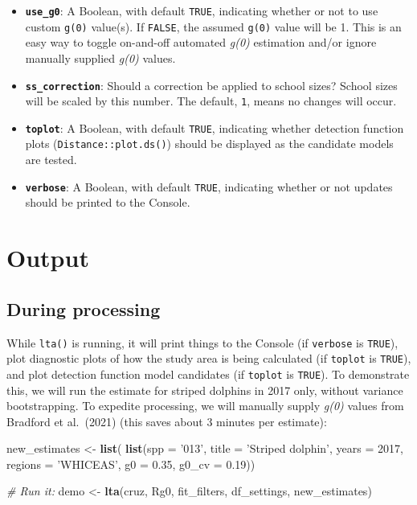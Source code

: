 \documentclass[
]{book}
\newenvironment{Shaded}{\begin{snugshade}}{\end{snugshade}}
\newcommand{\CommentTok}[1]{\textcolor[rgb]{0.56,0.35,0.01}{\textit{#1}}}
\newcommand{\DataTypeTok}[1]{\textcolor[rgb]{0.13,0.29,0.53}{#1}}
\newcommand{\DecValTok}[1]{\textcolor[rgb]{0.00,0.00,0.81}{#1}}
\newcommand{\FloatTok}[1]{\textcolor[rgb]{0.00,0.00,0.81}{#1}}
\newcommand{\KeywordTok}[1]{\textcolor[rgb]{0.13,0.29,0.53}{\textbf{#1}}}
\newcommand{\NormalTok}[1]{#1}
\newcommand{\StringTok}[1]{\textcolor[rgb]{0.31,0.60,0.02}{#1}}
\begin{document}
\begin{itemize}
\item
  \textbf{\texttt{use\_g0}}: A Boolean, with default \texttt{TRUE}, indicating whether or not to use custom \texttt{g(0)} value(s). If \texttt{FALSE}, the assumed \texttt{g(0)} value will be 1. This is an easy way to toggle on-and-off automated \emph{g(0)} estimation and/or ignore manually supplied \emph{g(0)} values.
\item
  \textbf{\texttt{ss\_correction}}: Should a correction be applied to school sizes? School sizes will be scaled by this number. The default, \texttt{1}, means no changes will occur.
\item
  \textbf{\texttt{toplot}}: A Boolean, with default \texttt{TRUE}, indicating whether detection function plots (\texttt{Distance::plot.ds()}) should be displayed as the candidate models are tested.
\item
  \textbf{\texttt{verbose}}: A Boolean, with default \texttt{TRUE}, indicating whether or not updates should be printed to the Console.
\end{itemize}

\hypertarget{output}{%
\section*{Output}\label{output}}

\hypertarget{during-processing}{%
\subsection*{During processing}\label{during-processing}}

While \texttt{lta()} is running, it will print things to the Console (if \texttt{verbose} is \texttt{TRUE}), plot diagnostic plots of how the study area is being calculated (if \texttt{toplot} is \texttt{TRUE}), and plot detection function model candidates (if \texttt{toplot} is \texttt{TRUE}). To demonstrate this, we will run the estimate for striped dolphins in 2017 only, without variance bootstrapping. To expedite processing, we will manually supply \emph{g(0)} values from Bradford et al.~(2021) (this saves about 3 minutes per estimate):

\begin{Shaded}
\begin{Highlighting}[]
\NormalTok{new_estimates <-}\StringTok{ }\KeywordTok{list}\NormalTok{(}
    \KeywordTok{list}\NormalTok{(}\DataTypeTok{spp =} \StringTok{'013'}\NormalTok{,}
         \DataTypeTok{title =} \StringTok{'Striped dolphin'}\NormalTok{,}
         \DataTypeTok{years =} \DecValTok{2017}\NormalTok{,}
         \DataTypeTok{regions =} \StringTok{'WHICEAS'}\NormalTok{,}
         \DataTypeTok{g0 =} \FloatTok{0.35}\NormalTok{, }\DataTypeTok{g0_cv =} \FloatTok{0.19}\NormalTok{))}

\CommentTok{# Run it:}
\NormalTok{demo <-}\StringTok{ }\KeywordTok{lta}\NormalTok{(cruz, Rg0, fit_filters, df_settings, new_estimates)}
\end{Highlighting}
\end{Shaded}
\end{document}
